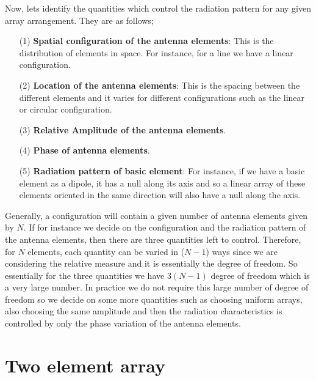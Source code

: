 Now, lets identify the quantities which control the radiation pattern for any given array arrangement. They are as follows;
\begin{enumerate}
	\item [(1)] \textbf{Spatial configuration of the antenna elements}: This is the distribution of elements in space. For instance, for a line we have a linear configuration. 
	\item[(2)]  \textbf{Location of the antenna elements}: This is the spacing between the different elements and it varies for different configurations such as the linear or circular configuration.
	\item[(3)]  \textbf{Relative Amplitude of the antenna elements}.
	\item[(4)] \textbf{Phase of antenna elements}.
	\item[(5)] \textbf{Radiation pattern of basic element}: For instance, if we have a basic element as a dipole, it has a null along its axis and so a linear array of these elements oriented in the same direction will also have a null along the axis.
\end{enumerate}


Generally, a configuration will contain a given number of antenna elements given by $N$. If for instance we decide on the configuration and the radiation pattern of the antenna elements,  then there are three quantities left to control. Therefore, for $N$ elements, each quantity can be varied in ($N-1$) ways since we are considering the relative measure and it is essentially the degree of freedom. So essentially for the three quantities we have $3(N-1)$ degree of freedom which is a very large number. In practice we do not require this large number of degree of freedom so we decide on some more quantities such as choosing uniform arrays, also choosing the same amplitude and then the radiation characteristics is controlled by only the phase variation of the antenna elements.



\section{Two element array}

